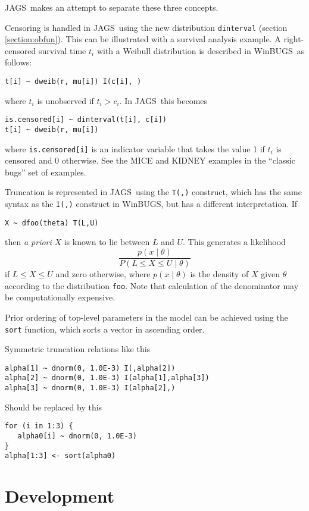 \documentclass[11pt, a4paper, titlepage]{report}
\newcommand{\JAGS}{\textsf{JAGS}}
\newcommand{\WinBUGS}{\textsf{WinBUGS}}
\begin{document}
\JAGS\ makes an attempt to separate these three concepts.

Censoring is handled in \JAGS\ using the new distribution
\texttt{dinterval} (section \ref{section:obfun}). This can be
illustrated with a survival analysis example.  A right-censored
survival time $t_i$ with a Weibull distribution is described in
\WinBUGS\ as follows:
\begin{verbatim}
t[i] ~ dweib(r, mu[i]) I(c[i], )
\end{verbatim}
where $t_i$ is unobserved if $t_i > c_i$.  In \JAGS\ this becomes
\begin{verbatim}
is.censored[i] ~ dinterval(t[i], c[i])
t[i] ~ dweib(r, mu[i])
\end{verbatim}
where \verb+is.censored[i]+ is an indicator variable that takes the
value 1 if $t_i$ is censored and 0 otherwise. See the MICE and KIDNEY
examples in the ``classic bugs'' set of examples.

Truncation is represented in \JAGS\ using the \texttt{T(,)} construct,
which has the same syntax as the \texttt{I(,)} construct in \WinBUGS,
but has a different interpretation. If
\begin{verbatim}
X ~ dfoo(theta) T(L,U)
\end{verbatim}
then {\em a priori} $X$ is known to lie between $L$ and $U$. This
generates a likelihood
\[
\frac{p(x \mid \theta)}{P(L \leq X \leq U \mid \theta)}
\]
if $L \leq X \leq U$ and zero otherwise, where $p(x \mid \theta)$ is
the density of $X$ given $\theta$ according to the distribution
\texttt{foo}. Note that calculation of the denominator may be
computationally expensive.

Prior ordering of top-level parameters in the model can be achieved
using the \texttt{sort} function, which sorts a vector in ascending
order.

Symmetric truncation relations like this
\begin{verbatim}
alpha[1] ~ dnorm(0, 1.0E-3) I(,alpha[2])
alpha[2] ~ dnorm(0, 1.0E-3) I(alpha[1],alpha[3])
alpha[3] ~ dnorm(0, 1.0E-3) I(alpha[2],)
\end{verbatim}
Should be replaced by this
\begin{verbatim}
for (i in 1:3) {
   alpha0[i] ~ dnorm(0, 1.0E-3)
}
alpha[1:3] <- sort(alpha0)
\end{verbatim}

\chapter{Development}
\end{document}

